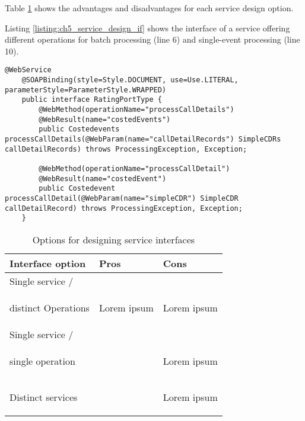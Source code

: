 Table \ref{table:ch05_service_design} shows the advantages and disadvantages for each service design option.

Listing \ref{listing:ch5_service_design_if} shows the interface of a service offering different operations for batch processing (line 6) and single-event processing (line 10).

\begin{lstlisting}[caption={Java interface of a web  service offering different operations for single and batch processing.},label=listing:ch5_service_design_if]
	@WebService
	@SOAPBinding(style=Style.DOCUMENT, use=Use.LITERAL, parameterStyle=ParameterStyle.WRAPPED)
	public interface RatingPortType {
		@WebMethod(operationName="processCallDetails")
		@WebResult(name="costedEvents")
		public Costedevents processCallDetails(@WebParam(name="callDetailRecords") SimpleCDRs callDetailRecords) throws ProcessingException, Exception;
	
		@WebMethod(operationName="processCallDetail")
		@WebResult(name="costedEvent")
		public Costedevent processCallDetail(@WebParam(name="simpleCDR") SimpleCDR callDetailRecord) throws ProcessingException, Exception;
	}
\end{lstlisting}

\begin{table}[htpb]
	\centering
	\begin{tabularx}{\textwidth}{@{} X X X @{}}
		\caption{Options for designing service interfaces}\label{table:ch05_service_design}\\
		\toprule
		\bfseries Interface option & \bfseries Pros & \bfseries Cons\\
		\midrule
		Single service /\\distinct Operations & \savespace
		\begin{titemize}
			\item Lorem ipsum
		\end{titemize} & \savespace
		\begin{titemize}
			\item Lorem ipsum
		\end{titemize}\\
		\midrule
		Single service /\\single operation & \savespace
		\begin{titemize}
			\item 
		\end{titemize} & \savespace
		\begin{titemize}
			\item Lorem ipsum
		\end{titemize}\\
		\midrule
		Distinct services & \savespace
		\begin{titemize}
			\item
		\end{titemize} & \savespace
		\begin{titemize}
			\item Lorem ipsum
		\end{titemize}\\
		\bottomrule
	\end{tabularx}
\end{table}

